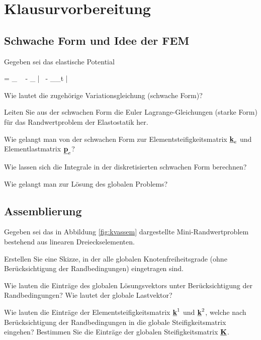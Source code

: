 \clearpage
\setcounter{page}{1}


\section{Klausurvorbereitung}



\subsection{Schwache Form und Idee der FEM}

Gegeben sei das elastische Potential

\ebn
\varPi =  \int_{\B} \Bvarepsilon \cdot \Bsigma\  
- \int_{\B} \bu \cdot \bar{\bb}\ 
- \int_{\p{}\B_t} \bu \cdot \bar{\bt}\ 
\een

\enab
\item Wie lautet die zugehörige Variationsgleichung (schwache Form)?
\item Leiten Sie aus der schwachen Form die Euler Lagrange-Gleichungen (starke Form) für das Randwertproblem der Elastostatik her.
\item Wie gelangt man von der schwachen Form zur Elementsteifigkeitsmatrix $\underline{{\bm{\mathrm{k}}}}_e$ und Elementlastmatrix $\underline{{\bm{\mathrm{p}}}}_e$?
\item Wie lassen sich die Integrale in der diskretisierten schwachen Form berechnen?
\item Wie gelangt man zur Lösung des globalen Problems?
\enae


\subsection{Assemblierung}

Gegeben sei das in Abbildung \ref{fig:kvassem} dargestellte Mini-Randwertproblem bestehend aus linearen Dreieckselementen. 


{\center

\label{fig:kvassem}
}

\enab
\item Erstellen Sie eine Skizze, in der alle globalen Knotenfreiheitsgrade (ohne Berücksichtigung der Randbedingungen) eingetragen sind.
\item Wie lauten die Einträge des globalen Lösungsvektors unter Berücksichtigung der Randbedingungen? 
      Wie lautet der globale Lastvektor?
\item Wie lauten die Einträge der Elementsteifigkeitsmatrix $\underline{{\bm{\mathrm{k}}}}^1$ und $\underline{{\bm{\mathrm{k}}}}^2$, welche nach Berücksichtigung der Randbedingungen in die globale Steifigkeitsmatrix eingehen?
      Bestimmen Sie die Einträge der globalen Steifigkeitsmatrix $\underline{{\bm{\mathrm{K}}}}$.
\enae



